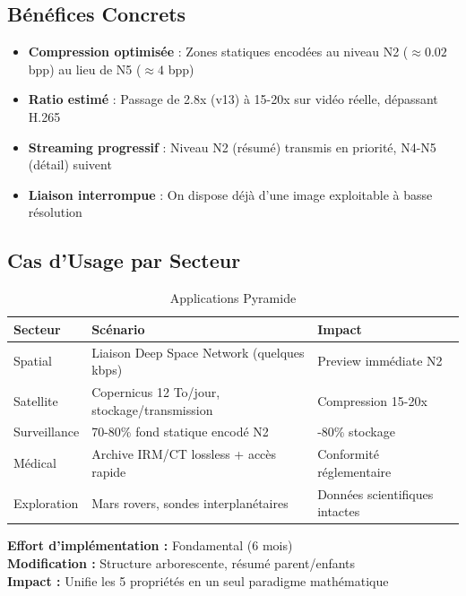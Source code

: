 \documentclass[12pt,a4paper]{article}
\begin{document}
	\subsection{Bénéfices Concrets}
	
	\begin{benefitbox}
		\begin{itemize}[leftmargin=*]
			\item \textbf{Compression optimisée} : Zones statiques encodées au niveau N2 ($\approx 0.02$ bpp) au lieu de N5 ($\approx 4$ bpp)
			\item \textbf{Ratio estimé} : Passage de 2.8x (v13) à 15-20x sur vidéo réelle, dépassant H.265
			\item \textbf{Streaming progressif} : Niveau N2 (résumé) transmis en priorité, N4-N5 (détail) suivent
			\item \textbf{Liaison interrompue} : On dispose déjà d'une image exploitable à basse résolution
		\end{itemize}
	\end{benefitbox}
	
	\subsection{Cas d'Usage par Secteur}
	
	\begin{table}[h]
		\centering
		\caption{Applications Pyramide}
		\label{tab:pyramide_usage}
		\begin{tabular}{@{}lll@{}}
			\toprule
			\textbf{Secteur} & \textbf{Scénario} & \textbf{Impact} \\ \midrule
			Spatial & Liaison Deep Space Network (quelques kbps) & Preview immédiate N2 \\
			Satellite & Copernicus 12 To/jour, stockage/transmission & Compression 15-20x \\
			Surveillance & 70-80\% fond statique encodé N2 & -80\% stockage \\
			Médical & Archive IRM/CT lossless + accès rapide & Conformité réglementaire \\
			Exploration & Mars rovers, sondes interplanétaires & Données scientifiques intactes \\
			\bottomrule
		\end{tabular}
	\end{table}
	
	\begin{techbox}
		\textbf{Effort d'implémentation :} Fondamental (6 mois) \\
		\textbf{Modification :} Structure arborescente, résumé parent/enfants \\
		\textbf{Impact :} Unifie les 5 propriétés en un seul paradigme mathématique
	\end{techbox}
	
\end{document}
